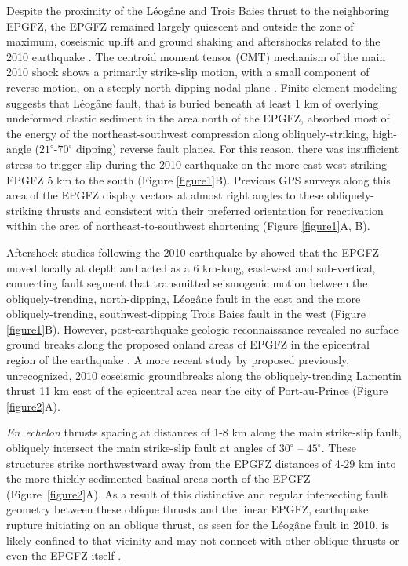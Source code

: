\documentclass[linenumbers,draft]{agujournal}
\begin{document}
Despite the proximity of the L\'eog\^ane and Trois Baies thrust to the neighboring EPGFZ, the EPGFZ remained largely quiescent and outside the zone of maximum, coseismic uplift and ground shaking and aftershocks related to the 2010 earthquake \citep{nettles2010earthquake}. The centroid moment tensor (CMT) mechanism of the main 2010 shock shows a primarily strike-slip motion, with a small component of reverse motion, on a steeply north-dipping nodal plane \citep{nettles2010earthquake,douilly2013crustal}. Finite element modeling \citep{douilly2015three} suggests that L\'eog\^ane fault, that is buried beneath at least 1 km of overlying undeformed clastic sediment in the area north of the EPGFZ, absorbed most of the energy of the northeast-southwest compression along obliquely-striking, high-angle ($21^{\circ}$-$70^{\circ}$ dipping) reverse fault planes. For this reason, there was insufficient stress to trigger slip during the 2010 earthquake on the more east-west-striking EPGFZ 5 km to the south (Figure \ref{figure1}B). Previous GPS surveys \citep{calais2010transpressional,calais2016plate} along this area of the EPGFZ display vectors at almost right angles to these obliquely-striking thrusts and consistent with their preferred orientation for reactivation within the area of northeast-to-southwest shortening (Figure \ref{figure1}A, B).

Aftershock studies following the 2010 earthquake by \citet{douilly2013crustal,douilly2015three} showed that the EPGFZ moved locally at depth and acted as a 6 km-long, east-west and sub-vertical, connecting fault segment that transmitted seismogenic motion between the obliquely-trending, north-dipping, L\'eog\^ane fault in the east and the more obliquely-trending, southwest-dipping Trois Baies fault in the west (Figure \ref{figure1}B). However, post-earthquake geologic reconnaissance revealed no surface ground breaks along the proposed onland areas of EPGFZ in the epicentral region of the earthquake \citep{prentice2010seismic,koehler2011field,rathje2014geotechnical}. A more recent study by \citet{saint2015seismotectonics} proposed previously, unrecognized, 2010 coseismic groundbreaks along the obliquely-trending Lamentin thrust 11 km east of the epicentral area near the city of Port-au-Prince (Figure \ref{figure2}A).

\textit{En~echelon} thrusts spacing at distances of 1-8 km along the main strike-slip fault, obliquely intersect the main strike-slip fault at angles of $30^{\circ}$ -- $45^{\circ}$. These structures strike northwestward away from the EPGFZ distances of 4-29 km into the more thickly-sedimented basinal areas north of the EPGFZ (Figure~\ref{figure2}A).  As a result of this distinctive and regular intersecting fault geometry between these oblique thrusts and the linear EPGFZ, earthquake rupture initiating on an oblique thrust, as seen for the L\'eog\^ane fault in 2010, is likely confined to that vicinity and may not connect with other oblique thrusts or even the EPGFZ itself \citep{douilly2013crustal,douilly2015three}.
\end{document}
